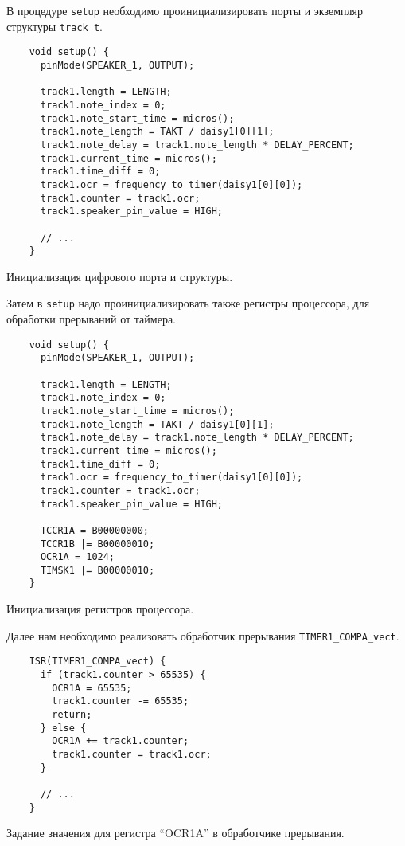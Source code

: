 \documentclass[../sparc.tex]{subfiles}
\begin{document}
В процедуре \texttt{setup} необходимо проинициализировать порты и
экземпляр структуры \texttt{track_t}.

\begin{listing}[H]
  \begin{verbatim}
    void setup() {
      pinMode(SPEAKER_1, OUTPUT);

      track1.length = LENGTH;
      track1.note_index = 0;
      track1.note_start_time = micros();
      track1.note_length = TAKT / daisy1[0][1];
      track1.note_delay = track1.note_length * DELAY_PERCENT;
      track1.current_time = micros();
      track1.time_diff = 0;
      track1.ocr = frequency_to_timer(daisy1[0][0]);
      track1.counter = track1.ocr;
      track1.speaker_pin_value = HIGH;

      // ...
    }
  \end{verbatim}
  \caption{Инициализация цифрового порта и структуры.}
  \label{listing:mcu-music-7}
\end{listing}

Затем в \texttt{setup} надо проинициализировать также регистры
процессора, для обработки прерываний от таймера.

\begin{listing}[H]
  \begin{verbatim}
    void setup() {
      pinMode(SPEAKER_1, OUTPUT);

      track1.length = LENGTH;
      track1.note_index = 0;
      track1.note_start_time = micros();
      track1.note_length = TAKT / daisy1[0][1];
      track1.note_delay = track1.note_length * DELAY_PERCENT;
      track1.current_time = micros();
      track1.time_diff = 0;
      track1.ocr = frequency_to_timer(daisy1[0][0]);
      track1.counter = track1.ocr;
      track1.speaker_pin_value = HIGH;

      TCCR1A = B00000000;
      TCCR1B |= B00000010;
      OCR1A = 1024;
      TIMSK1 |= B00000010;
    }
  \end{verbatim}
  \caption{Инициализация регистров процессора.}
  \label{listing:mcu-music-8}
\end{listing}

Далее нам необходимо реализовать обработчик прерывания
\texttt{TIMER1_COMPA_vect}.

\begin{listing}[H]
  \begin{verbatim}
    ISR(TIMER1_COMPA_vect) {
      if (track1.counter > 65535) {
        OCR1A = 65535;
        track1.counter -= 65535;
        return;
      } else {
        OCR1A += track1.counter;
        track1.counter = track1.ocr;
      }

      // ...
    }
  \end{verbatim}
  \caption{Задание значения для регистра ``OCR1A'' в обработчике прерывания.}
  \label{listing:mcu-music-9}
\end{listing}
\end{document}
